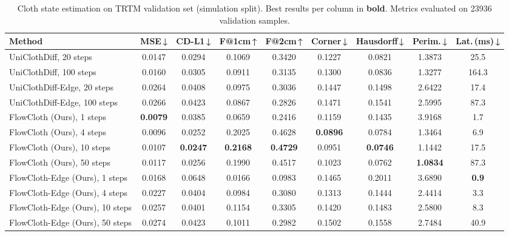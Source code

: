 \documentclass{article}
\begin{document}
\begin{table}[htb!]
  \centering
  \caption{Cloth state estimation on TRTM validation set (simulation split).
            Best results per column in \textbf{bold}.
            Metrics evaluated on 23936 validation samples.}
  \label{tab:state_est_trtm}
  \setlength{\tabcolsep}{5pt}
  \begin{adjustbox}{tabular, center}
  \begin{tabular}{l c c c c c c c c}
    \toprule
    \textbf{Method} &
    \textbf{MSE\,↓} &
    \textbf{CD-L1\,↓} &
    \textbf{F@1cm\,↑} &
    \textbf{F@2cm\,↑} &
    \textbf{Corner\,↓} &
    \textbf{Hausdorff\,↓} &
    \textbf{Perim.\,↓} &
    \textbf{Lat.\,(ms)\,↓} \\
    \midrule
    UniClothDiff, 20 steps & 0.0147 & 0.0294 & 0.1069 & 0.3420 & 0.1227 & 0.0821 & 1.3873 & 25.5 \\
    UniClothDiff, 100 steps & 0.0160 & 0.0305 & 0.0911 & 0.3135 & 0.1300 & 0.0836 & 1.3277 & 164.3 \\
    UniClothDiff-Edge, 20 steps & 0.0264 & 0.0408 & 0.0975 & 0.3036 & 0.1447 & 0.1498 & 2.6422 & 17.4 \\
    UniClothDiff-Edge, 100 steps & 0.0266 & 0.0423 & 0.0867 & 0.2826 & 0.1471 & 0.1541 & 2.5995 & 87.3 \\
    \midrule
    FlowCloth (Ours), 1 steps & \textbf{0.0079} & 0.0385 & 0.0659 & 0.2416 & 0.1159 & 0.1435 & 3.9168 & 1.7 \\
    FlowCloth (Ours), 4 steps & 0.0096 & 0.0252 & 0.2025 & 0.4628 & \textbf{0.0896} & 0.0784 & 1.3464 & 6.9 \\
    FlowCloth (Ours), 10 steps & 0.0107 & \textbf{0.0247} & \textbf{0.2168} & \textbf{0.4729} & 0.0951 & \textbf{0.0746} & 1.1442 & 17.5 \\
    FlowCloth (Ours), 50 steps & 0.0117 & 0.0256 & 0.1990 & 0.4517 & 0.1023 & 0.0762 & \textbf{1.0834} & 87.3 \\
    FlowCloth-Edge (Ours), 1 steps & 0.0168 & 0.0648 & 0.0166 & 0.0983 & 0.1465 & 0.2011 & 3.6890 & \textbf{0.9} \\
    FlowCloth-Edge (Ours), 4 steps & 0.0227 & 0.0404 & 0.0984 & 0.3080 & 0.1313 & 0.1444 & 2.4414 & 3.3 \\
    FlowCloth-Edge (Ours), 10 steps & 0.0257 & 0.0401 & 0.1154 & 0.3305 & 0.1420 & 0.1483 & 2.5800 & 8.3 \\
    FlowCloth-Edge (Ours), 50 steps & 0.0274 & 0.0423 & 0.1011 & 0.2982 & 0.1502 & 0.1558 & 2.7484 & 40.9 \\
    \bottomrule
  \end{tabular}
  \end{adjustbox}
\end{table}
\end{document}
